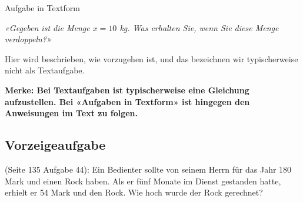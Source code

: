 \begin{beispiel}{Aufgabe in Textform}{}

\begin{center}{\textit{«Gegeben ist die Menge
$x=10$ kg. Was erhalten Sie, wenn Sie diese Menge verdoppeln?»}}\end{center}

Hier wird beschrieben, wie vorzugehen ist,
und das bezeichnen wir typischerweise nicht als Textaufgabe.
\end{beispiel}

\textbf{Merke: Bei Textaufgaben ist typischerweise eine Gleichung
aufzustellen. Bei «Aufgaben in Textform» ist hingegen den Anweisungen im
Text zu folgen.}
 
\newpage
\subsection{Vorzeigeaufgabe}
\cite{bardey1878} (Seite 135 Aufgabe 44): Ein Bedienter sollte von seinem Herrn für das Jahr 180 Mark und einen Rock haben. Als er fünf Monate im Dienst gestanden hatte, erhielt er 54 Mark und den Rock. Wie hoch wurde der Rock gerechnet?



\newpage

